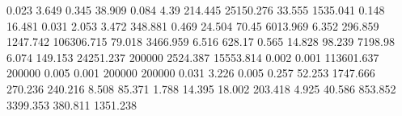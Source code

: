0.023      3.649      %
0.345      38.909     %
0.084      4.39       %
214.445    25150.276  %
33.555     1535.041   %
0.148      16.481     %
0.031      2.053      %
3.472      348.881    %
0.469      24.504     %
70.45      6013.969   %
6.352      296.859    %
1247.742   106306.715 %
79.018     3466.959   %
6.516      628.17     %
0.565      14.828     %
98.239     7198.98    %
6.074      149.153    %
24251.237  200000     %
2524.387   15553.814  %
0.002      0.001      %
113601.637 200000     %
0.005      0.001      %
200000     200000     %
0.031      3.226      %
0.005      0.257      %
52.253     1747.666   %
270.236    240.216    %
8.508      85.371     %
1.788      14.395     %
18.002     203.418    %
4.925      40.586     %
853.852    3399.353   %
380.811    1351.238   %
